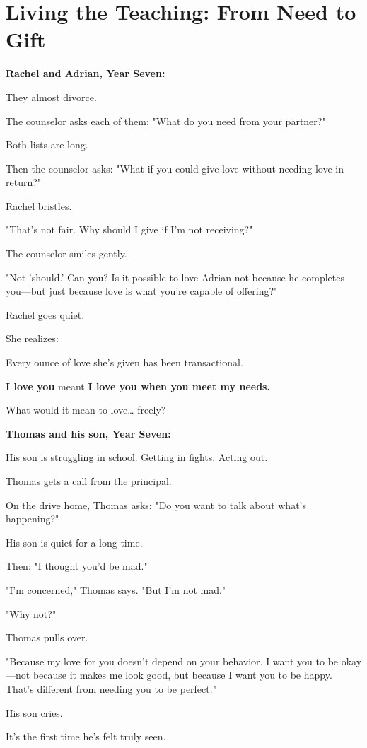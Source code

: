 \documentclass[11pt,twoside]{book}
\begin{document}
\section*{Living the Teaching: From Need to Gift}

\textbf{\textbf{Rachel and Adrian, Year Seven:}}

They almost divorce.

The counselor asks each of them: "What do you need from your partner?"

Both lists are long.

Then the counselor asks: "What if you could give love without needing love in return?"

Rachel bristles.

"That's not fair. Why should I give if I'm not receiving?"

The counselor smiles gently.

"Not 'should.' Can you? Is it possible to love Adrian not because he completes you—but just because love is what you're capable of offering?"

Rachel goes quiet.

She realizes:

Every ounce of love she's given has been transactional.

\textbf{I love you} meant \textbf{I love you when you meet my needs.}

What would it mean to love\ldots{} freely?

\textbf{\textbf{Thomas and his son, Year Seven:}}

His son is struggling in school. Getting in fights. Acting out.

Thomas gets a call from the principal.

On the drive home, Thomas asks: "Do you want to talk about what's happening?"

His son is quiet for a long time.

Then: "I thought you'd be mad."

"I'm concerned," Thomas says. "But I'm not mad."

"Why not?"

Thomas pulls over.

"Because my love for you doesn't depend on your behavior. I want you to be okay—not because it makes me look good, but because I want you to be happy. That's different from needing you to be perfect."

His son cries.

It's the first time he's felt truly seen.
\end{document}
